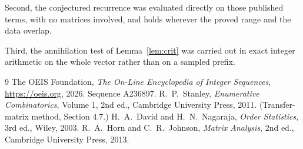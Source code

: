 \documentclass[11pt,a4paper]{article}
\theoremstyle{plain}
\theoremstyle{definition}
\begin{document}
Second, the conjectured recurrence was evaluated directly on those published terms, with no
matrices involved, and holds wherever the proved range and the data overlap.

Third, the annihilation test of Lemma~\ref{lem:crit} was carried out in exact integer
arithmetic on the whole vector rather than on a sampled prefix.

\begin{thebibliography}{9}
 The OEIS Foundation, \emph{The On-Line Encyclopedia of Integer
Sequences}, \url{https://oeis.org}, 2026. Sequence A236897.
 R.~P.~Stanley, \emph{Enumerative Combinatorics}, Volume 1, 2nd ed.,
Cambridge University Press, 2011. (Transfer-matrix method, Section 4.7.)
 H.~A.~David and H.~N.~Nagaraja, \emph{Order Statistics}, 3rd ed., Wiley,
2003.
 R.~A.~Horn and C.~R.~Johnson, \emph{Matrix Analysis}, 2nd ed., Cambridge
University Press, 2013.
\end{thebibliography}
\end{document}

